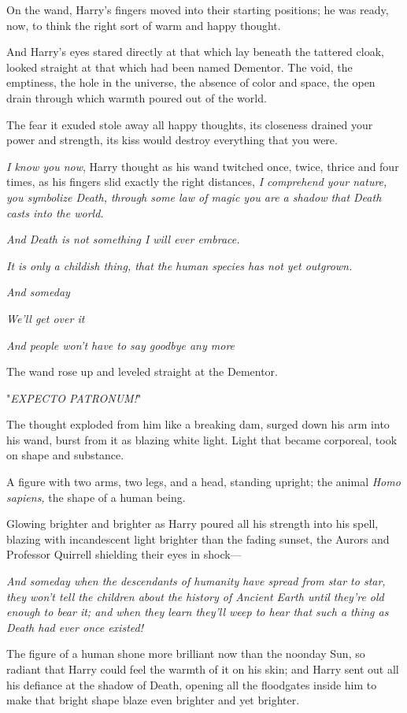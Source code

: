 On the wand, Harry's fingers moved into their starting positions; he was ready,
now, to think the right sort of warm and happy thought.

And Harry's eyes stared directly at that which lay beneath the tattered cloak,
looked straight at that which had been named Dementor. The void, the emptiness,
the hole in the universe, the absence of color and space, the open drain
through which warmth poured out of the world.

The fear it exuded stole away all happy thoughts, its closeness drained your
power and strength, its kiss would destroy everything that you were.

\emph{I know you now}, Harry thought as his wand twitched once, twice, thrice
and four times, as his fingers slid exactly the right distances, \emph{I
comprehend your nature, you symbolize Death, through some law of magic you are
a shadow that Death casts into the world.}

\emph{And Death is not something I will ever embrace.}

\emph{It is only a childish thing, that the human species has not yet outgrown.}

\emph{And someday{\el}}

\emph{We'll get over it{\el}}

\emph{And people won't have to say goodbye any more{\el}}

The wand rose up and leveled straight at the Dementor.

"\emph{EXPECTO PATRONUM!}"

The thought exploded from him like a breaking dam, surged down his arm into his
wand, burst from it as blazing white light. Light that became corporeal, took
on shape and substance.

A figure with two arms, two legs, and a head, standing upright; the animal
\emph{Homo sapiens,} the shape of a human being.

Glowing brighter and brighter as Harry poured all his strength into his spell,
blazing with incandescent light brighter than the fading sunset, the Aurors and
Professor Quirrell shielding their eyes in shock---

\emph{And someday when the descendants of humanity have spread from star to
star, they won't tell the children about the history of Ancient Earth until
they're old enough to bear it; and when they learn they'll weep to hear that
such a thing as Death had ever once existed!}

The figure of a human shone more brilliant now than the noonday Sun, so radiant
that Harry could feel the warmth of it on his skin; and Harry sent out all his
defiance at the shadow of Death, opening all the floodgates inside him to make
that bright shape blaze even brighter and yet brighter.

